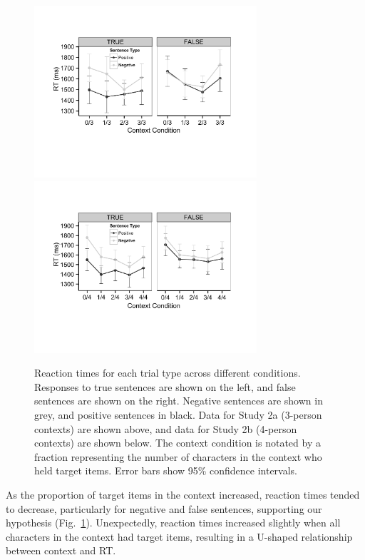 \documentclass[10pt,letterpaper]{article}
\begin{document}
\begin{figure}[t]
\begin{center} 
\includegraphics[width=3.25in]{figures/study2a_linegraph.pdf}
\includegraphics[width=3.25in]{figures/study2b_linegraph.pdf}
\caption{\label{fig:e2line} Reaction times for each trial type across different conditions. Responses to true sentences are shown on the left, and false sentences are shown on the right.  Negative sentences are shown in grey, and positive sentences in black.  Data for Study 2a (3-person contexts) are shown above, and data for Study 2b (4-person contexts) are shown below.  The context condition is notated by a fraction representing the number of characters in the context who held target items. Error bars show 95\% confidence intervals.  }
\end{center} 
\end{figure}

As the proportion of target items in the context increased, reaction times tended to decrease, particularly for negative and false sentences, supporting our hypothesis (Fig.\ \ref{fig:e2line}).  Unexpectedly, reaction times increased slightly when all characters in the context had target items, resulting in a U-shaped relationship between context and RT.  
\end{document}
